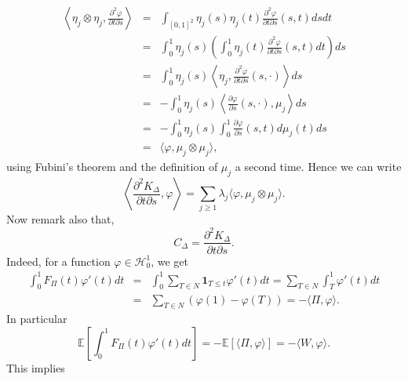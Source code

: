 \documentclass[aos]{imsart}
\theoremstyle{plain}
\theoremstyle{remark}
\newcommand{\1}{1}
\begin{document}
\begin{eqnarray*}
\left\langle \eta_j\otimes\eta_j, \frac{\partial^2 \varphi}{\partial t\partial s}\right\rangle &=&\int_{[0,1]^2}\eta_j(s)\eta_j(t)\frac{\partial^2 \varphi}{\partial t\partial s}(s,t)dsdt\\
&=&\int_0^1\eta_j(s)\left(\int_0^1\eta_j(t)\frac{\partial^2 \varphi}{\partial t\partial s}(s,t)dt\right)ds\\
&=&\int_0^1\eta_j(s)\left\langle\eta_j,\frac{\partial^2 \varphi}{\partial t\partial s}(s,\cdot)\right\rangle ds\\
&=&-\int_0^1\eta_j(s)\left\langle\frac{\partial \varphi}{\partial s}(s,\cdot),\mu_j\right\rangle ds\\
&=&-\int_0^1\eta_j(s)\int_0^1\frac{\partial \varphi}{\partial s}(s,t)d\mu_j(t) ds\\
&=&\langle\varphi,\mu_j\otimes\mu_j\rangle,
\end{eqnarray*}
using Fubini's theorem and the definition of $\mu_j$ a second time. 
Hence we can write 
\[
\left\langle\frac{\partial^2 K_\Delta}{\partial t\partial s},\varphi\right\rangle = \sum_{j\geq 1}\lambda_j\langle\varphi,\mu_j\otimes\mu_j\rangle. 
\]
Now remark also that,
\[
C_\Delta = \frac{\partial^2 K_\Delta}{\partial t\partial s}. 
\] 
Indeed, for a function $\varphi\in\mathcal H_0^1$, we get 
\begin{eqnarray*}
\int_0^1F_\Pi(t)\varphi'(t)dt &=& \int_0^1\sum_{T\in N}\mathbf 1_{T\leq t}\varphi'(t)dt=\sum_{T\in N}\int_T^1\varphi'(t)dt\\
&=&\sum_{T\in N}(\varphi(1)-\varphi(T))=-\langle\Pi,\varphi\rangle. 
\end{eqnarray*}
In particular 
\[
\mathbb E\left[\int_0^1F_\Pi(t)\varphi'(t)dt\right] = -\mathbb E[\langle\Pi,\varphi\rangle] = -\langle W,\varphi\rangle. 
\]
This implies
\end{document}
